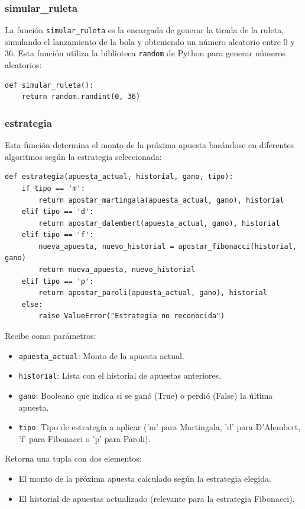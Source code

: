 \documentclass{article}
\begin{document}
\subsubsection{simular\_ruleta}
La función \texttt{simular\_ruleta} es la encargada de generar la tirada de la ruleta, simulando el lanzamiento de la bola y obteniendo un número aleatorio entre 0 y 36. Esta función utiliza la biblioteca \texttt{random} de Python para generar números aleatorios:

\begin{verbatim}
def simular_ruleta():
    return random.randint(0, 36)
\end{verbatim}

\subsubsection{estrategia}
Esta función determina el monto de la próxima apuesta basándose en diferentes algoritmos según la estrategia seleccionada:

\begin{verbatim}
def estrategia(apuesta_actual, historial, gano, tipo):
    if tipo == 'm':
        return apostar_martingala(apuesta_actual, gano), historial
    elif tipo == 'd':
        return apostar_dalembert(apuesta_actual, gano), historial
    elif tipo == 'f':
        nueva_apuesta, nuevo_historial = apostar_fibonacci(historial, gano)
        return nueva_apuesta, nuevo_historial
    elif tipo == 'p':
        return apostar_paroli(apuesta_actual, gano), historial
    else:
        raise ValueError("Estrategia no reconocida")
\end{verbatim}

Recibe como parámetros:
\begin{itemize}
    \item \texttt{apuesta\_actual}: Monto de la apuesta actual.
    \item \texttt{historial}: Lista con el historial de apuestas anteriores.
    \item \texttt{gano}: Booleano que indica si se ganó (True) o perdió (False) la última apuesta.
    \item \texttt{tipo}: Tipo de estrategia a aplicar ('m' para Martingala, 'd' para D'Alembert, 'f' para Fibonacci o 'p' para Paroli).
\end{itemize}

Retorna una tupla con dos elementos:
\begin{itemize}
    \item El monto de la próxima apuesta calculado según la estrategia elegida.
    \item El historial de apuestas actualizado (relevante para la estrategia Fibonacci).
\end{itemize}
\end{document}

